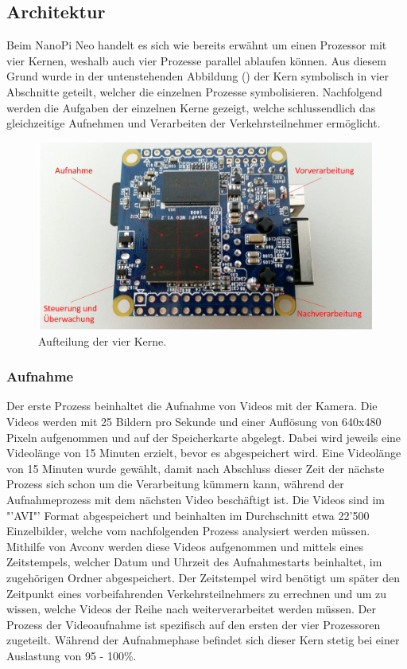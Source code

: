 \subsection{Architektur}
Beim NanoPi Neo handelt es sich wie bereits erwähnt um einen Prozessor mit vier Kernen, weshalb auch vier Prozesse parallel ablaufen können. Aus diesem Grund wurde in der untenstehenden Abbildung () der Kern symbolisch in vier Abschnitte geteilt, welcher die einzelnen Prozesse symbolisieren. Nachfolgend werden die Aufgaben der einzelnen Kerne gezeigt, welche schlussendlich das gleichzeitige Aufnehmen und Verarbeiten der Verkehrsteilnehmer ermöglicht.

\begin{figure}[H]
  \centering
  \includegraphics[width=0.99\textwidth]{Software/Architektur.jpg} 
  \caption{Aufteilung der vier Kerne.}
  \label{bArchitektur}
\end{figure}


\subsubsection{Aufnahme}
Der erste Prozess beinhaltet die Aufnahme von Videos mit der Kamera. Die Videos werden mit 25 Bildern pro Sekunde und einer Auflösung von 640x480 Pixeln aufgenommen und auf der Speicherkarte abgelegt. Dabei wird jeweils eine Videolänge von 15 Minuten erzielt, bevor es abgespeichert wird. Eine Videolänge von 15 Minuten wurde gewählt, damit nach Abschluss dieser Zeit der nächste Prozess sich schon um die Verarbeitung kümmern kann, während der Aufnahmeprozess mit dem nächsten Video beschäftigt ist. Die Videos sind im "'AVI"' Format abgespeichert und beinhalten im Durchschnitt etwa 22'500 Einzelbilder, welche vom nachfolgenden Prozess analysiert werden müssen. Mithilfe von Avconv werden diese Videos aufgenommen und mittels eines Zeitstempels, welcher Datum und Uhrzeit des Aufnahmestarts beinhaltet, im zugehörigen Ordner abgespeichert. Der Zeitstempel wird benötigt um später den Zeitpunkt eines vorbeifahrenden Verkehrsteilnehmers zu errechnen und um zu wissen, welche Videos der Reihe nach weiterverarbeitet werden müssen. Der Prozess der Videoaufnahme ist spezifisch auf den ersten der vier Prozessoren zugeteilt. Während der Aufnahmephase befindet sich dieser Kern stetig bei einer Auslastung von 95 - 100\%.


